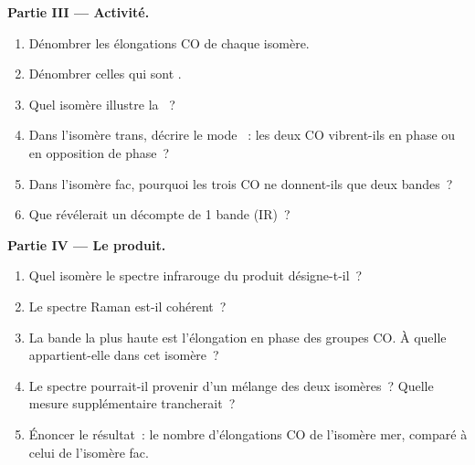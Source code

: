 \begin{problem}
\medskip\noindent\textbf{Partie III --- Activité.}
\begin{enumerate}[resume]
  \item Dénombrer les élongations CO  de chaque isomère.
  \item Dénombrer celles qui sont .
  \item Quel isomère illustre la ~?
  \item Dans l'isomère trans, décrire le mode ~: les deux CO
        vibrent-ils en phase ou en opposition de phase~?
  \item Dans l'isomère fac, pourquoi les trois CO ne donnent-ils que deux
        bandes~?
  \item Que révélerait un décompte de 1 bande (IR)~?
\end{enumerate}

\medskip\noindent\textbf{Partie IV --- Le produit.}
\begin{enumerate}[resume]
  \item Quel isomère le spectre infrarouge du produit désigne-t-il~?
  \item Le spectre Raman est-il cohérent~?
  \item La bande la plus haute est l'élongation en phase des groupes CO.
        À quelle  appartient-elle dans cet
        isomère~?
  \item Le spectre pourrait-il provenir d'un mélange des deux isomères~?
        Quelle mesure supplémentaire trancherait~?
  \item Énoncer le résultat~: le nombre d'élongations CO  de
        l'isomère mer, comparé à celui de l'isomère fac.
\end{enumerate}
\end{problem}

